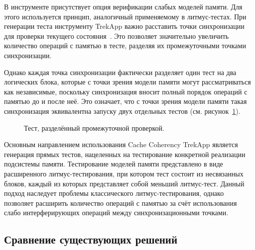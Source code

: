 В инструменте присутствует опция верификации слабых моделей
памяти. Для этого используется принцип, аналогичный применяемому в
литмус-тестах. При генерации теста инструменту TrekApp важно
расставить точки синхронизации для проверки текущего
состояния~\cite{breker}. Это позволяет значительно увеличить
количество операций с памятью в тесте, разделяя их промежуточными
точками синхронизации.

Однако каждая точка синхронизации фактически разделяет один тест на
два логических блока, которые с точки зрения модели памяти могут
рассматриваться как независимые, поскольку синхронизация вносит
полный порядок операций с памятью до и после неё. Это означает, что с
точки зрения модели памяти такая синхронизация эквивалентна запуску
двух отдельных тестов (см. рисунок~\ref{fig:litmus-disadv}).

\begin{figure}[htbp]
  \centerfloat{
    
  }
  \caption{Тест, разделённый промежуточной проверкой.}
  \label{fig:litmus-disadv}
\end{figure}

Основным направлением использования Cache Coherency TrekApp является
генерация прямых тестов, нацеленных на тестирование конкретной
реализации подсистемы памяти. Тестирование моделей памяти
представлено в виде расширенного литмус-тестирования, при котором
тест состоит из несвязанных блоков, каждый из которых представляет
собой меньший литмус-тест. Данный подход наследует проблемы
классического литмус-тестирования, однако позволяет расширить
количество операций с памятью за счёт использования слабо
интерферирующих операций между синхронизационными точками.

\subsection{Сравнение существующих решений}
\label{sec:ch1/comparison}

